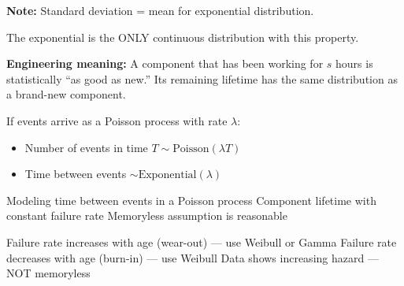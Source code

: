 





\textbf{Note:} Standard deviation = mean for exponential distribution.



The exponential is the ONLY continuous distribution with this property.

\textbf{Engineering meaning:} A component that has been working for $s$ hours is statistically ``as good as new.'' Its remaining lifetime has the same distribution as a brand-new component.


If events arrive as a Poisson process with rate $\lambda$:

\begin{itemize}
\tightlist
\item
  Number of events in time $T \sim \mathrm{Poisson}(\lambda T)$
\item
  Time between events $\sim \mathrm{Exponential}(\lambda)$
\end{itemize}


\PSyes{} Modeling time between events in a Poisson process\PSbr{}\PSyes{} Component lifetime with constant failure rate\PSbr{}\PSyes{} Memoryless assumption is reasonable


\PSno{} Failure rate increases with age (wear-out) — use Weibull or Gamma\PSbr{}\PSno{} Failure rate decreases with age (burn-in) — use Weibull\PSbr{}\PSno{} Data shows increasing hazard — NOT memoryless



